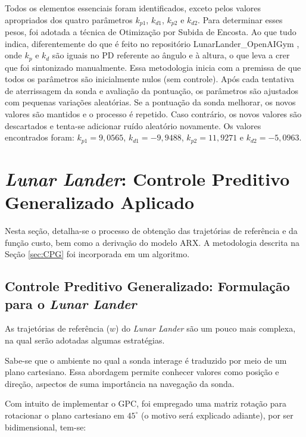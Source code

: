 \documentclass[12pt,           %
a4paper,                       %
openany,                       %
oneside,                       %
chapter=TITLE,                 %
english,                       %
spanish,                       %
brazil,                        %
sumario=tradicional]{abntex2}  %
\begin{document}
\begin{OnehalfSpace}
Todos os elementos essenciais foram identificados, exceto pelos valores apropriados dos quatro parâmetros $k_{p1}$, $k_{d1}$, $k_{p2}$ e $k_{d2}$. Para determinar esses pesos, foi adotada a técnica de Otimização por Subida de Encosta. Ao que tudo indica, diferentemente do que é feito no repositório LunarLander\_OpenAIGym \cite{llpid}, onde $k_p$ e $k_d$ são iguais no PD referente ao ângulo e à altura, o que leva a crer que foi sintonizado manualmente. Essa metodologia inicia com a premissa de que todos os parâmetros são inicialmente nulos (sem controle). Após cada tentativa de aterrissagem da sonda e avaliação da pontuação, os parâmetros são ajustados com pequenas variações aleatórias. Se a pontuação da sonda melhorar, os novos valores são mantidos e o processo é repetido. Caso contrário, os novos valores são descartados e tenta-se adicionar ruído aleatório novamente. Os valores encontrados foram: $k_{p1} = 9,0565$, $k_{d1} = -9,9488$, $k_{p2} = 11,9271$ e $k_{d2} = -5,0963$. 

\section{\textit{Lunar Lander}: Controle Preditivo Generalizado Aplicado}
\label{sec:GPCfor}    

Nesta seção, detalha-se o processo de obtenção das trajetórias de referência e da função custo, bem como a derivação do modelo ARX. A metodologia descrita na Seção \ref{sec:CPG} foi incorporada em um algoritmo.

\subsection{Controle Preditivo Generalizado: Formulação para o \textit{Lunar Lander}}
\label{subsec:GPCtr}   

As trajetórias de referência ($w$) do \textit{Lunar Lander} são um pouco mais complexa, na qual serão adotadas algumas estratégias. 

Sabe-se que o ambiente no qual a sonda interage é traduzido por meio de um plano cartesiano. Essa abordagem permite conhecer valores como posição e direção, aspectos de suma importância na navegação da sonda.

Com intuito de implementar o GPC, foi empregado uma matriz rotação para rotacionar o plano cartesiano em $45^\circ$ (o motivo será explicado adiante), por ser bidimensional, tem-se:


\end{OnehalfSpace}
\end{document}
